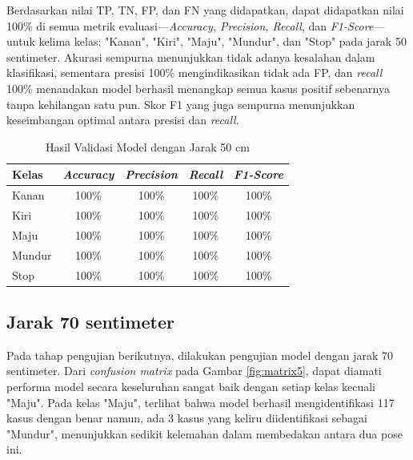 Berdasarkan nilai TP, TN, FP, dan FN yang didapatkan, dapat didapatkan nilai 100\% di semua metrik evaluasi—\emph{Accuracy, Precision, Recall}, dan \emph{F1-Score}—untuk kelima kelas: "Kanan", "Kiri", "Maju", "Mundur", dan "Stop" pada jarak 50 sentimeter. Akurasi sempurna menunjukkan tidak adanya kesalahan dalam klasifikasi, sementara presisi 100\% mengindikasikan tidak ada FP, dan \emph{recall} 100\% menandakan model berhasil menangkap semua kasus positif sebenarnya tanpa kehilangan satu pun. Skor F1 yang juga sempurna menunjukkan keseimbangan optimal antara presisi dan \emph{recall}.

\begin{longtable}{|l|c|c|c|c|}
  \caption{Hasil Validasi Model dengan Jarak 50 cm}
  \label{tb:vs_model3} \\
  \hline
  \rowcolor[HTML]{C0C0C0} 
  \textbf{Kelas} & \textbf{\emph{Accuracy}} & \textbf{\emph{Precision}} & \textbf{\emph{Recall}} & \textbf{\emph{F1-Score}} \\ \hline
  Kanan    & 100\%            & 100\%             & 100\%           & 100\%            \\ \hline
  Kiri     & 100\%          & 100\%           & 100\%           & 100\%           \\ \hline
  Maju      & 100\%          & 100\%           & 100\%          & 100\%          \\ \hline
  Mundur     & 100\%            & 100\%             & 100\%           & 100\%            \\ \hline
  Stop  & 100\%            & 100\%             & 100\%           & 100\%            \\ \hline
\end{longtable}

\subsection{Jarak 70 sentimeter}

Pada tahap pengujian berikutnya, dilakukan pengujian model dengan jarak 70 sentimeter. Dari \emph{confusion matrix} pada Gambar \ref{fig:matrix5}, dapat diamati performa model secara keseluruhan sangat baik dengan setiap kelas kecuali "Maju". Pada kelas "Maju", terlihat bahwa model berhasil mengidentifikasi 117 kasus dengan benar namun, ada 3 kasus yang keliru diidentifikasi sebagai "Mundur", menunjukkan sedikit kelemahan dalam membedakan antara dua pose ini.

